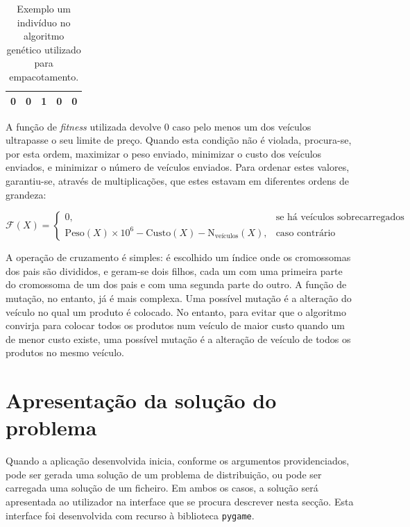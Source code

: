 \documentclass[12pt, a4paper]{article}
\begin{document}
\begin{table}[H]
    \begin{center}
        \begin{tabular}{|c|c|c|c|c|}
            \hline 0 & 0 & 1 & 0 & 0 \\ \hline
        \end{tabular}

        \caption{Exemplo um indivíduo no algoritmo genético utilizado para empacotamento.}
    \end{center}
\end{table}

A função de \emph{fitness} utilizada devolve 0 caso pelo menos um dos veículos ultrapasse o seu
limite de preço. Quando esta condição não é violada, procura-se, por esta ordem, maximizar o
peso enviado, minimizar o custo dos veículos enviados, e minimizar o número de veículos enviados.
Para ordenar estes valores, garantiu-se, através de multiplicações, que estes estavam em diferentes
ordens de grandeza:

$$
\mathcal{F}(X) =
\begin{cases}
    0
        ,& \text{se há veículos sobrecarregados} \\
    \text{Peso}(X) \times 10^6 - \text{Custo}(X) - \text{N}_\text{veículos}(X)
        ,& \text{caso contrário}
\end{cases}
$$

A operação de cruzamento é simples: é escolhido um índice onde os cromossomas dos pais são
divididos, e geram-se dois filhos, cada um com uma primeira parte do cromossoma de um dos pais e com
uma segunda parte do outro. A função de mutação, no entanto, já é mais complexa. Uma possível
mutação é a alteração do veículo no qual um produto é colocado. No entanto, para evitar que o
algoritmo convirja para colocar todos os produtos num veículo de maior custo quando um de menor
custo existe, uma possível mutação é a alteração de veículo de todos os produtos no mesmo veículo.

\section{Apresentação da solução do problema}

Quando a aplicação desenvolvida inicia, conforme os argumentos providenciados, pode ser gerada uma
solução de um problema de distribuição, ou pode ser carregada uma solução de um ficheiro. Em ambos
os casos, a solução será apresentada ao utilizador na interface que se procura descrever nesta
secção. Esta interface foi desenvolvida com recurso à biblioteca \texttt{pygame}.
\end{document}
